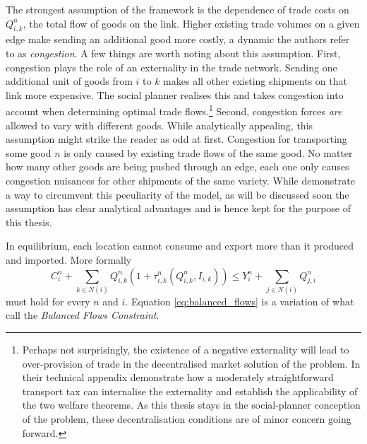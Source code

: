 \documentclass[11pt, oneside]{article}   	%
\begin{document}
The strongest assumption of the \citeauthor{fajgelbaum_optimal_2017} framework is the dependence of trade costs on $Q_{i,k}^{n}$, the total flow of goods on the link. Higher existing trade volumes on a given edge make sending an additional good more costly, a dynamic the authors refer to as \emph{congestion}. A few things are worth noting about this assumption. First, congestion plays the role of an externality in the trade network. Sending one additional unit of goods from $i$ to $k$ makes all other existing shipments on that link more expensive. The social planner realises this and takes congestion into account when determining optimal trade flows.\footnote{Perhaps not surprisingly, the existence of a negative externality will lead to over-provision of trade in the decentralised market solution of the problem. In their technical appendix \citeauthor{fajgelbaum_optimal_2017} demonstrate how a moderately straightforward transport tax can internalise the externality and establish the applicability of the two welfare theorems. As this thesis stays in the social-planner conception of the problem, these decentralisation conditions are of minor concern going forward.} Second, congestion forces \emph{are} allowed to vary with different goods. While analytically appealing, this assumption might strike the reader as odd at first. Congestion for transporting some good $n$ is only caused by existing trade flows of the same good. No matter how many other goods are being pushed through an edge, each one only causes congestion nuisances for other shipments of the same variety. While \citeauthor{fajgelbaum_optimal_2017} demonstrate a way to circumvent this peculiarity of the model, as will be discussed soon the assumption has clear analytical advantages and is hence kept for the purpose of this thesis.

In equilibrium, each location cannot consume and export more than it produced and imported. More formally
\begin{equation}
  C_{i}^{n} + \sum_{k\in N(i)}^{}Q_{i,k}^{n}(1+\tau_{i,k}^{n}(Q_{i,k}^{n}, I_{i,k})) \leq Y_{i}^{n} + \sum_{j\in N(i)}^{}Q_{j,i}^{n}
  \label{eq:balanced_flows}
\end{equation}
must hold for every $n$ and $i$. Equation \eqref{eq:balanced_flows} is a variation of what \citeauthor{fajgelbaum_optimal_2017} call the \emph{Balanced Flows Constraint}.
\end{document}

